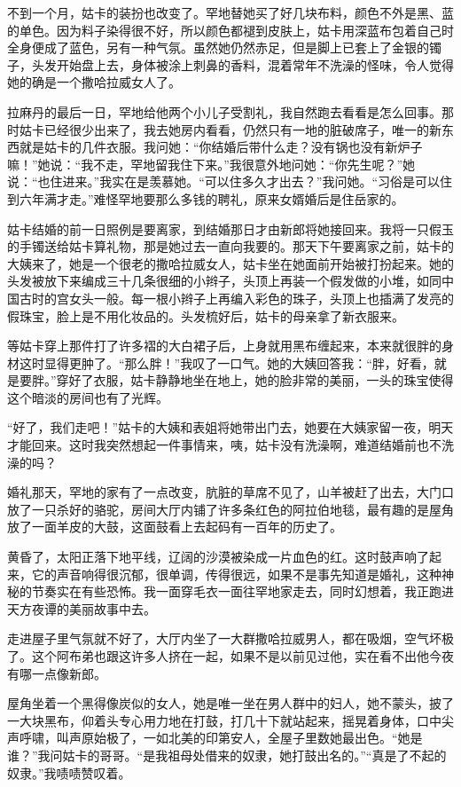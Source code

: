 \par 不到一个月，姑卡的装扮也改变了。罕地替她买了好几块布料，颜色不外是黑、蓝的单色。因为料子染得很不好，所以颜色都褪到皮肤上，姑卡用深蓝布包着自己时全身便成了蓝色，另有一种气氛。虽然她仍然赤足，但是脚上已套上了金银的镯子，头发开始盘上去，身体被涂上刺鼻的香料，混着常年不洗澡的怪味，令人觉得她的确是一个撒哈拉威女人了。
\par 拉麻丹的最后一日，罕地给他两个小儿子受割礼，我自然跑去看看是怎么回事。那时姑卡已经很少出来了，我去她房内看看，仍然只有一地的脏破席子，唯一的新东西就是姑卡的几件衣服。我问她：“你结婚后带什么走？没有锅也没有新炉子嘛！”她说：“我不走，罕地留我住下来。”我很意外地问她：“你先生呢？”她说：“也住进来。”我实在是羡慕她。“可以住多久才出去？”我问她。“习俗是可以住到六年满才走。”难怪罕地要那么多钱的聘礼，原来女婿婚后是住岳家的。
\par 姑卡结婚的前一日照例是要离家，到结婚那日才由新郎将她接回来。我将一只假玉的手镯送给姑卡算礼物，那是她过去一直向我要的。那天下午要离家之前，姑卡的大姨来了，她是一个很老的撒哈拉威女人，姑卡坐在她面前开始被打扮起来。她的头发被放下来编成三十几条很细的小辫子，头顶上再装一个假发做的小堆，如同中国古时的宫女头一般。每一根小辫子上再编入彩色的珠子，头顶上也插满了发亮的假珠宝，脸上是不用化妆品的。头发梳好后，姑卡的母亲拿了新衣服来。
\par 等姑卡穿上那件打了许多褶的大白裙子后，上身就用黑布缠起来，本来就很胖的身材这时显得更肿了。“那么胖！”我叹了一口气。她的大姨回答我：“胖，好看，就是要胖。”穿好了衣服，姑卡静静地坐在地上，她的脸非常的美丽，一头的珠宝使得这个暗淡的房间也有了光辉。
\par “好了，我们走吧！”姑卡的大姨和表姐将她带出门去，她要在大姨家留一夜，明天才能回来。这时我突然想起一件事情来，咦，姑卡没有洗澡啊，难道结婚前也不洗澡的吗？
\par 婚礼那天，罕地的家有了一点改变，肮脏的草席不见了，山羊被赶了出去，大门口放了一只杀好的骆驼，房间大厅内铺了许多条红色的阿拉伯地毯，最有趣的是屋角放了一面羊皮的大鼓，这面鼓看上去起码有一百年的历史了。
\par 黄昏了，太阳正落下地平线，辽阔的沙漠被染成一片血色的红。这时鼓声响了起来，它的声音响得很沉郁，很单调，传得很远，如果不是事先知道是婚礼，这种神秘的节奏实在有些恐怖。我一面穿毛衣一面往罕地家走去，同时幻想着，我正跑进天方夜谭的美丽故事中去。
\par 走进屋子里气氛就不好了，大厅内坐了一大群撒哈拉威男人，都在吸烟，空气坏极了。这个阿布弟也跟这许多人挤在一起，如果不是以前见过他，实在看不出他今夜有哪一点像新郎。
\par 屋角坐着一个黑得像炭似的女人，她是唯一坐在男人群中的妇人，她不蒙头，披了一大块黑布，仰着头专心用力地在打鼓，打几十下就站起来，摇晃着身体，口中尖声呼啸，叫声原始极了，一如北美的印第安人，全屋子里数她最出色。“她是谁？”我问姑卡的哥哥。“是我祖母处借来的奴隶，她打鼓出名的。”“真是了不起的奴隶。”我啧啧赞叹着。
